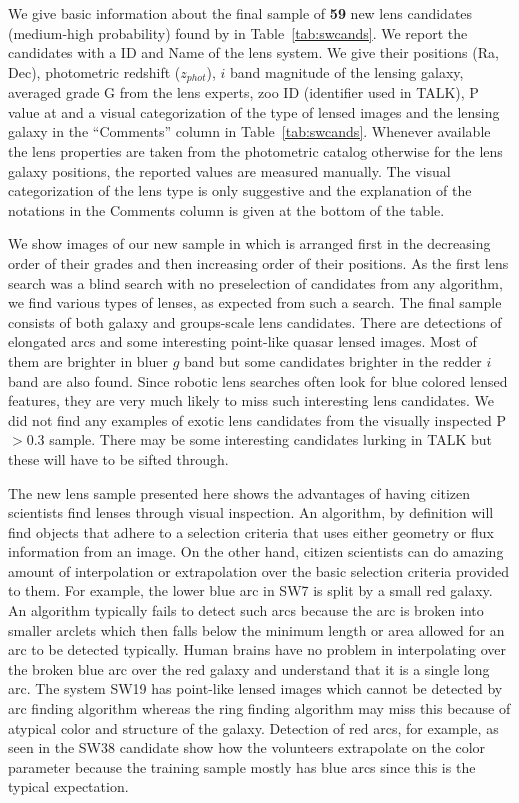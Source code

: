 \documentclass[useAMS,usenatbib,a4paper]{mn2e}
\begin{document}
We give basic information about the final sample of {\bf 59} new lens
candidates (medium-high probability) found by \sw in
Table~\ref{tab:swcands}. We report the candidates with a \sw ID and Name
of the lens system. We give their positions (Ra, Dec), photometric
redshift ($z_{phot}$), $i$ band magnitude of the lensing galaxy,
averaged grade G from the lens experts, zoo ID (identifier used in
TALK), P value at \StageTwo and a visual categorization of the type of
lensed images and the lensing galaxy in the ``Comments'' column in
Table~\ref{tab:swcands}. Whenever available the lens properties are
taken from the \cfhtls photometric catalog \citep{Coupon2009} otherwise
for the lens galaxy positions, the reported values are measured
manually. The visual categorization of the lens type is only suggestive
and the explanation of the notations in the Comments column is given at
the bottom of the table.

We show images of our new sample in  which is arranged
first in the decreasing order of their grades and then increasing order
of their positions. As the first lens search was a blind search with no
preselection of candidates from any algorithm, we find various types of
lenses, as expected from such a search. The final sample consists of
both galaxy and groups-scale lens candidates. There are detections of
elongated arcs and some interesting point-like quasar lensed images.
Most of them are brighter in bluer $g$ band but some candidates brighter
in the redder $i$ band are also found. Since robotic lens searches often
look for blue colored lensed features, they are very much likely to miss
such interesting lens candidates. We did not find any examples of
exotic lens candidates from the visually inspected P$>0.3$ sample. There
may be some interesting candidates lurking in TALK but these will have
to be sifted through.

The new \sw lens sample presented here shows the advantages of having
citizen scientists find lenses through visual inspection. An algorithm,
by definition will find objects that adhere to a selection criteria that
uses either geometry or flux information from an image. On the other
hand, citizen scientists can do amazing amount of interpolation or
extrapolation over the basic selection criteria provided to them.  For
example, the lower blue arc in SW7 is split by a small red galaxy.  An
algorithm typically fails to detect such arcs because the arc is broken
into smaller arclets which then falls below the minimum length or area
allowed for an arc to be detected typically. Human brains have no
problem in interpolating over the broken blue arc over the red galaxy
and understand that it is a single long arc. The system SW19 has
point-like lensed images which cannot be detected by arc finding
algorithm whereas the ring finding algorithm may miss this because of
atypical color and structure of the galaxy. Detection of red arcs, for
example, as seen in the SW38 candidate show how the volunteers
extrapolate on the color parameter because the training sample mostly
has blue arcs since this is the typical expectation.
\end{document}
